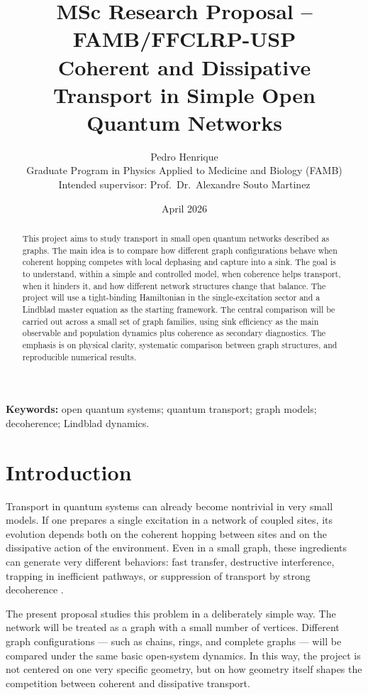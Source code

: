 \documentclass[11pt,a4paper]{article}
\title{\textbf{MSc Research Proposal -- FAMB/FFCLRP-USP}\\
\large Coherent and Dissipative Transport in Simple Open Quantum Networks}
\author{
Pedro Henrique\\
\small Graduate Program in Physics Applied to Medicine and Biology (FAMB)\\
\small Intended supervisor: Prof.\ Dr.\ Alexandre Souto Martinez
}
\date{April 2026}
\begin{document}
\maketitle

\begin{abstract}
This project aims to study transport in small open quantum networks described as
graphs. The main idea is to compare how different graph configurations behave
when coherent hopping competes with local dephasing and capture into a sink. The
goal is to understand, within a simple and controlled model, when coherence
helps transport, when it hinders it, and how different network structures
change that balance. The project will use a tight-binding Hamiltonian in the
single-excitation sector and a Lindblad master equation as the starting
framework. The central comparison will be carried out across a small set of
graph families, using sink efficiency as the main observable and population
dynamics plus coherence as secondary diagnostics. The emphasis is on physical
clarity, systematic comparison between graph structures, and reproducible
numerical results.
\end{abstract}

\noindent\textbf{Keywords:} open quantum systems; quantum transport; graph models;
decoherence; Lindblad dynamics.

\section{Introduction}

Transport in quantum systems can already become nontrivial in very small models.
If one prepares a single excitation in a network of coupled sites, its evolution
depends both on the coherent hopping between sites and on the dissipative action
of the environment. Even in a small graph, these ingredients can generate very
different behaviors: fast transfer, destructive interference, trapping in
inefficient pathways, or suppression of transport by strong decoherence
\citep{mohseni_2008,plenio_huelga_2008,rebentrost_2009,caruso_2009}.

The present proposal studies this problem in a deliberately simple way. The
network will be treated as a graph with a small number of vertices. Different
graph configurations --- such as chains, rings, and complete graphs --- will be
compared under the same basic open-system dynamics. In this way, the project is
not centered on one very specific geometry, but on how geometry itself shapes
the competition between coherent and dissipative transport.
\end{document}
